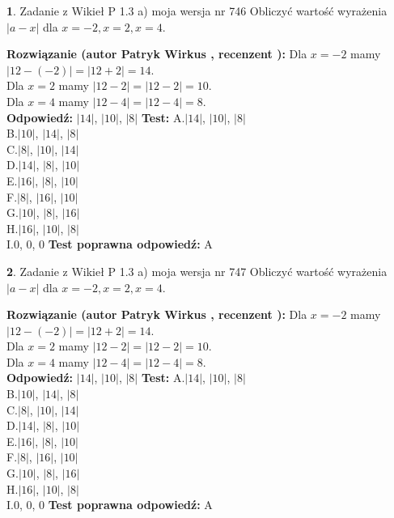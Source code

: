 \documentclass[12pt, a4paper]{article}
\theoremstyle{definition} %
\newtheorem{zad}{}
\newcommand{\zadStart}[1]{\begin{zad}#1\newline}
\newcommand{\zadStop}{\end{zad}}
\newcommand{\rozwStart}[2]{\noindent \textbf{Rozwiązanie (autor #1 , recenzent #2): }\newline}
\newcommand{\rozwStop}{\newline}
\newcommand{\odpStart}{\noindent \textbf{Odpowiedź:}\newline}
\newcommand{\odpStop}{\newline}
\newcommand{\testStart}{\noindent \textbf{Test:}\newline}
\newcommand{\testStop}{\newline}
\newcommand{\kluczStart}{\noindent \textbf{Test poprawna odpowiedź:}\newline}
\newcommand{\kluczStop}{\newline}
\begin{document}
\zadStart{Zadanie z Wikieł P 1.3 a) moja wersja nr 746}
Obliczyć wartość wyrażenia $|a - x|$ dla $x=-2,x=2,x=4$.
\zadStop
\rozwStart{Patryk Wirkus}{}
Dla $x = -2$ mamy $|12 - (-2)| = |12 + 2| = 14$.\\
Dla $x = 2$ mamy $|12 - 2| = |12 - 2| = 10$.\\
Dla $x = 4$ mamy $|12 - 4| = |12 - 4| = 8$.\\
\rozwStop
\odpStart
$|14|$, $|10|$, $|8|$
\odpStop
\testStart
A.$|14|$, $|10|$, $|8|$\\
B.$|10|$, $|14|$, $|8|$\\
C.$|8|$, $|10|$, $|14|$\\
D.$|14|$, $|8|$, $|10|$\\
E.$|16|$, $|8|$, $|10|$\\
F.$|8|$, $|16|$, $|10|$\\
G.$|10|$, $|8|$, $|16|$\\
H.$|16|$, $|10|$, $|8|$\\
I.$0$, $0$, $0$
\testStop
\kluczStart
A
\kluczStop



\zadStart{Zadanie z Wikieł P 1.3 a) moja wersja nr 747}
Obliczyć wartość wyrażenia $|a - x|$ dla $x=-2,x=2,x=4$.
\zadStop
\rozwStart{Patryk Wirkus}{}
Dla $x = -2$ mamy $|12 - (-2)| = |12 + 2| = 14$.\\
Dla $x = 2$ mamy $|12 - 2| = |12 - 2| = 10$.\\
Dla $x = 4$ mamy $|12 - 4| = |12 - 4| = 8$.\\
\rozwStop
\odpStart
$|14|$, $|10|$, $|8|$
\odpStop
\testStart
A.$|14|$, $|10|$, $|8|$\\
B.$|10|$, $|14|$, $|8|$\\
C.$|8|$, $|10|$, $|14|$\\
D.$|14|$, $|8|$, $|10|$\\
E.$|16|$, $|8|$, $|10|$\\
F.$|8|$, $|16|$, $|10|$\\
G.$|10|$, $|8|$, $|16|$\\
H.$|16|$, $|10|$, $|8|$\\
I.$0$, $0$, $0$
\testStop
\kluczStart
A
\kluczStop
\end{document}
